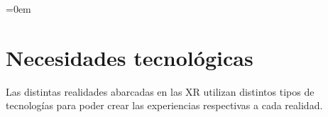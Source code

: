 \parindent=0em
\section{Necesidades tecnológicas}
\noindent

Las distintas realidades abarcadas en las XR utilizan distintos tipos de tecnologías para poder crear las experiencias respectivas a cada realidad. \\









